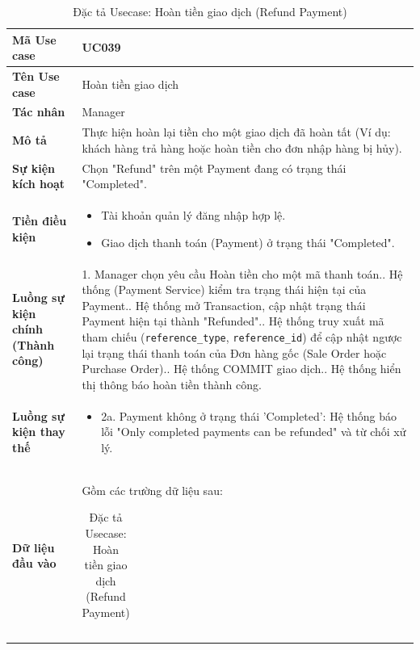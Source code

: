 \documentclass[12pt,a4paper]{report}
\begin{document}
\begin{longtable}{|>{\raggedright\arraybackslash\bfseries}p{4.5cm}|p{11cm}|}
\caption{Đặc tả Usecase: Hoàn tiền giao dịch (Refund Payment)} \label{tab:uc_039} \\
\hline
Mã Use case & UC039 \\ \hline
Tên Use case & Hoàn tiền giao dịch \\ \hline
Tác nhân & Manager \\ \hline
Mô tả & Thực hiện hoàn lại tiền cho một giao dịch đã hoàn tất (Ví dụ: khách hàng trả hàng hoặc hoàn tiền cho đơn nhập hàng bị hủy). \\ \hline
Sự kiện kích hoạt & Chọn "Refund" trên một Payment đang có trạng thái "Completed". \\ \hline
Tiền điều kiện & 
\begin{itemize}[leftmargin=*, nosep, topsep=0pt, partopsep=0pt]
    \item Tài khoản quản lý đăng nhập hợp lệ.
    \item Giao dịch thanh toán (Payment) ở trạng thái "Completed".
\end{itemize} \\ \hline
Luồng sự kiện chính (Thành công) & 
1. Manager chọn yêu cầu Hoàn tiền cho một mã thanh toán.\newline
2. Hệ thống (Payment Service) kiểm tra trạng thái hiện tại của Payment.\newline
3. Hệ thống mở Transaction, cập nhật trạng thái Payment hiện tại thành "Refunded".\newline
4. Hệ thống truy xuất mã tham chiếu (\texttt{reference\_type}, \texttt{reference\_id}) để cập nhật ngược lại trạng thái thanh toán của Đơn hàng gốc (Sale Order hoặc Purchase Order).\newline
5. Hệ thống COMMIT giao dịch.\newline
6. Hệ thống hiển thị thông báo hoàn tiền thành công. \\ \hline
Luồng sự kiện thay thế & 
\begin{itemize}[leftmargin=*, nosep, topsep=0pt, partopsep=0pt]
    \item 2a. Payment không ở trạng thái 'Completed': Hệ thống báo lỗi "Only completed payments can be refunded" và từ chối xử lý.
\end{itemize} \\ \hline
Dữ liệu đầu vào & 
Gồm các trường dữ liệu sau:\newline
\vspace{0.1cm}
\begin{tabular}{|p{3.5cm}|p{2.5cm}|p{4cm}|}

\end{tabular}
\end{longtable}
\end{document}
